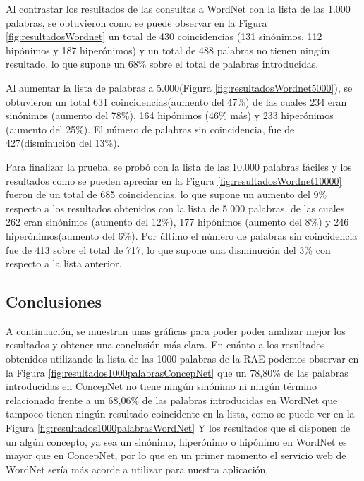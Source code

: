 Al contrastar los resultados de las consultas a WordNet con la lista de las 1.000 palabras, se obtuvieron como se puede observar en la Figura \ref{fig:resultadosWordnet} un total de 430 coincidencias (131 sinónimos, 112 hipónimos y 187 hiperónimos) y un total de 488 palabras no tienen ningún resultado, lo que supone un 68\% sobre el total de palabras introducidas.


Al aumentar la lista de palabras a 5.000(Figura \ref{fig:resultadosWordnet5000}), se obtuvieron un total 631 coincidencias(aumento del 47\%) de las cuales 234 eran sinónimos (aumento del 78\%), 164 hipónimos (46\% más) y 233 hiperónimos (aumento del 25\%). El número de palabras sin coincidencia, fue de 427(disminución del 13\%).


Para finalizar la prueba, se probó con la lista de las 10.000 palabras fáciles y los resultados como se pueden apreciar en la Figura \ref{fig:resultadosWordnet10000} fueron de un total de 685 coincidencias, lo que supone un aumento del 9\% respecto a los resultados obtenidos con la lista de 5.000 palabras, de las cuales 262 eran sinónimos (aumento del 12\%), 177 hipónimos (aumento del 8\%) y 246 hiperónimos(aumento del 6\%). Por último el número de palabras sin coincidencia fue de 413 sobre el total de 717, lo que supone una disminución del 3\% con respecto a la lista anterior.


\subsection{Conclusiones}
\label{cap:subsec:conclusionesPruebas}

A continuación, se muestran unas gráficas para poder poder analizar mejor los resultados y obtener una conclusión más clara. En cuánto a los resultados obtenidos utilizando la lista de las 1000 palabras de la RAE podemos observar en la Figura \ref{fig:resultados1000palabrasConcepNet} que un 78,80\% de las palabras introducidas en ConcepNet no tiene ningún sinónimo ni ningún término relacionado frente a un 68,06\% de las palabras introducidas en WordNet que tampoco tienen ningún resultado coincidente en la lista, como se puede ver en la Figura \ref{fig:resultados1000palabrasWordNet} Y los resultados que si disponen de un algún concepto, ya sea un sinónimo, hiperónimo o hipónimo en WordNet es mayor que en ConcepNet, por lo que en un primer momento el servicio web de WordNet sería más acorde a utilizar para nuestra aplicación.

